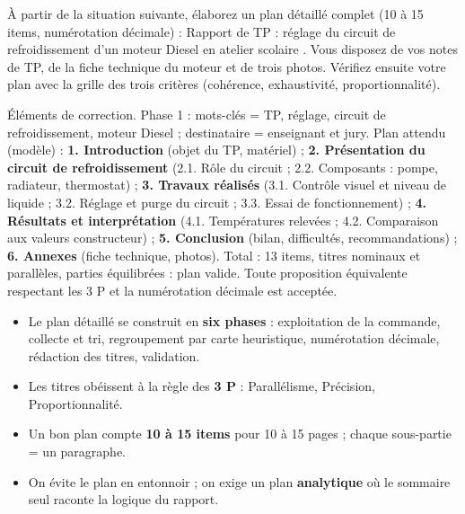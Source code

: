\documentclass[11pt]{article}
\begin{document}
\begin{exercice}
À partir de la situation suivante, élaborez un plan détaillé complet (10 à 15 items, numérotation décimale) : \og Rapport de TP : réglage du circuit de refroidissement d'un moteur Diesel en atelier scolaire \fg{}. Vous disposez de vos notes de TP, de la fiche technique du moteur et de trois photos. Vérifiez ensuite votre plan avec la grille des trois critères (cohérence, exhaustivité, proportionnalité).
\end{exercice}

\begin{corrige}[Exercice 1]
Éléments de correction. Phase 1 : mots-clés = TP, réglage, circuit de refroidissement, moteur Diesel ; destinataire = enseignant et jury. Plan attendu (modèle) : \textbf{1. Introduction} (objet du TP, matériel) ; \textbf{2. Présentation du circuit de refroidissement} (2.1. Rôle du circuit ; 2.2. Composants : pompe, radiateur, thermostat) ; \textbf{3. Travaux réalisés} (3.1. Contrôle visuel et niveau de liquide ; 3.2. Réglage et purge du circuit ; 3.3. Essai de fonctionnement) ; \textbf{4. Résultats et interprétation} (4.1. Températures relevées ; 4.2. Comparaison aux valeurs constructeur) ; \textbf{5. Conclusion} (bilan, difficultés, recommandations) ; \textbf{6. Annexes} (fiche technique, photos). Total : 13 items, titres nominaux et parallèles, parties équilibrées : plan valide. Toute proposition équivalente respectant les 3 P et la numérotation décimale est acceptée.
\end{corrige}

\begin{aretenir}
\begin{itemize}
\item Le plan détaillé se construit en \textbf{six phases} : exploitation de la commande, collecte et tri, regroupement par carte heuristique, numérotation décimale, rédaction des titres, validation.
\item Les titres obéissent à la règle des \textbf{3 P} : Parallélisme, Précision, Proportionnalité.
\item Un bon plan compte \textbf{10 à 15 items} pour 10 à 15 pages ; chaque sous-partie = un paragraphe.
\item On évite le plan \og en entonnoir \fg{} ; on exige un plan \textbf{analytique} où le sommaire seul raconte la logique du rapport.
\end{itemize}
\end{aretenir}
\end{document}
